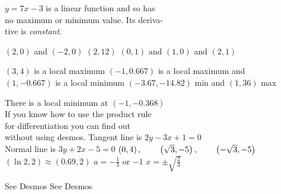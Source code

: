 \begin{Answer}[ref={exMinMax}]
		\Question %
		$y=7x-3$ is a linear function and so has \\
		no maximum or minimum value. Its deriva-\\
		tive is \emph{constant}.
	\Question %
	\begin{tasks}
		\task $(2,0)$ and $(-2,0)$
		\task $(2,12)$
		\task $(0,1)$ and $(1,0)$ and $(2,1)$
	\end{tasks}
	\Question %
	\begin{tasks}
		\task $(3,4)$ is a local maximum
		\task $(-1,0.667)$ is a local maximum and\\ $(1,-0.667)$ is a local minimum
		\task $(-3.67,-14.82)$ min and $(1,36)$ max
	\end{tasks}
	\Question %
			  There is a local minimum at $(-1,-0.368)$\\
			  If you know how to use the product rule \\
			  for differentiation you can find out \\
			  without using desmos.
\Question %
Tangent line is $2 y -3 x +1 =0$ \\\relax Normal line is $3 y +2 x -5 =0$ 
\Question %
$\left (0 ,4\right ) ,\text{\quad \quad }\left (\sqrt{3} , -5\right ) ,\text{\quad \quad }\left ( -\sqrt{3} , -5\right )$
\Question %
$\left (\ln  2 ,2\right ) \approx \left (0.69 ,2\right )$
\Question %
$a = -\frac{1}{3}$ or $ -1$
\Question %
$x = \pm \sqrt{\frac{2}{3}}$ 

\Question %
See Desmos
\Question %
See Desmos	
\end{Answer}%

